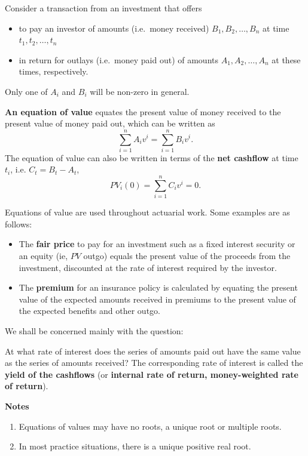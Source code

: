 \documentclass[
]{book}
\theoremstyle{definition}
\theoremstyle{definition}
\theoremstyle{definition}
\theoremstyle{definition}
\theoremstyle{remark}
\begin{document}
Consider a transaction from an investment that offers

\begin{itemize}
\item
  to pay an investor of amounts (i.e.~money received)
  \(B_1, B_2, \ldots, B_n\) at time \(t_1, t_2, \ldots ,t_n\)
\item
  in return for outlays (i.e.~money paid out) of amounts
  \(A_1, A_2, \ldots, A_n\) at these times, respectively.
\end{itemize}

Only one of \(A_i\) and \(B_i\) will be non-zero in general.

\textbf{An equation of value} equates the present value of money received to
the present value of money paid out, which can be written as
\[\sum_{i=1}^n A_i v^i = \sum_{i=1}^n B_i v^i.\] The equation of value
can also be written in terms of the \textbf{net cashflow} at time \(t_i\), i.e.
\(C_t = B_t - A_t\), \[PV_i(0) = \sum_{i=1}^n C_i v^i =0.\]

Equations of value are used throughout actuarial work. Some examples are
as follows:

\begin{itemize}
\item
  The \textbf{fair price} to pay for an investment such as a fixed interest
  security or an equity (ie, \(PV\) outgo) equals the present value of
  the proceeds from the investment, discounted at the rate of interest
  required by the investor.
\item
  The \textbf{premium} for an insurance policy is calculated by equating
  the present value of the expected amounts received in premiums to
  the present value of the expected benefits and other outgo.
\end{itemize}

We shall be concerned mainly with the question:

At what rate of interest does the series of amounts paid out have the
same value as the series of amounts received? The corresponding rate of
interest is called the \textbf{yield of the cashflows} (or \textbf{internal rate of
return, money-weighted rate of return}).

\textbf{Notes}

\begin{enumerate}
\def\labelenumi{\arabic{enumi}.}
\item
  Equations of values may have no roots, a unique root or multiple
  roots.
\item
  In most practice situations, there is a unique positive real root.
\end{enumerate}
\end{document}
